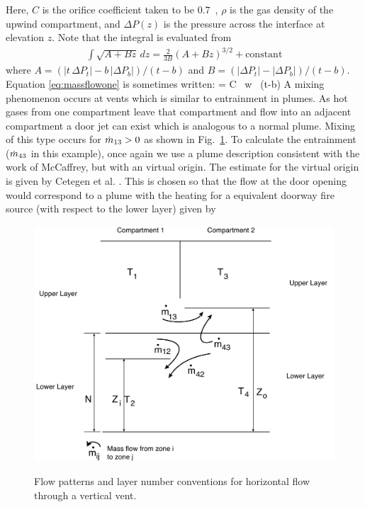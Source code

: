 Here, $C$ is the orifice coefficient taken to be 0.7~\cite{Steckler_Coefficients}, $\rho$ is the gas density of the upwind compartment, and $\Delta P(z)$ is the pressure across the interface at elevation $z$. Note that the integral is evaluated from
\begin{eqnarray}
\int \sqrt{A+Bz} \, dz = \frac{2}{3B}(A+Bz)^{3/2}+\mbox{constant}
\end{eqnarray}
where $A=(|t\,\Delta P_t|-b\,|\Delta P_b|)/(t-b)$ and $B=(|\Delta P_t|-|\Delta P_b|)/(t-b)$.
Equation \ref{eq:massflowone} is sometimes written:
\be \dm =  C \sqrt{2 \rho} \, w \, (t-b)   \ee
A mixing phenomenon occurs at vents which is similar to entrainment in plumes.  As hot gases from one compartment leave that compartment and flow into an adjacent compartment a door jet can exist which is analogous to a normal plume.  Mixing of this type occurs for $\dot{m}_{13} > 0$ as shown in Fig.~\ref{fig:Flow_Patterns}.  To calculate the entrainment ($\dot{m}_{43}$ in this example), once again we use a plume description consistent with the work of McCaffrey, but with an virtual origin.  The estimate for the virtual origin is given by Cetegen et al. \cite{Cetegen:1984}.  This  is chosen so that the flow at the door opening would correspond to a plume with the heating for a equivalent doorway fire source (with respect to the lower layer) given by

\begin{figure}[t]
\begin{center}
\includegraphics[width=5.0in]{FIGURES/Theory/Flow_Patterns}\\
\end{center}
\caption{Flow patterns and layer number conventions for horizontal flow through a vertical vent.}
 \label{fig:Flow_Patterns}
\end{figure}


